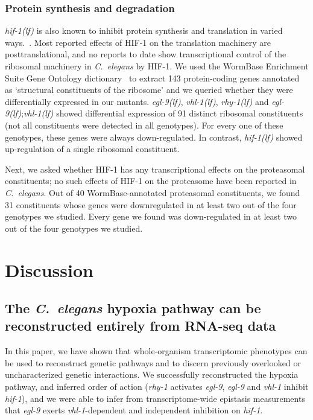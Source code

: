\documentclass[10pt, onecolumn]{article}
\newcommand{\cel}{\emph{C.~elegans}}
\newcommand{\gene}[1]{\emph{#1}}
\newcommand{\egl}{\emph{\mbox{egl-9}(lf)}}
\newcommand{\rhy}{\emph{\mbox{rhy-1}(lf)}}
\newcommand{\vhl}{\emph{\mbox{vhl-1}(lf)}}
\newcommand{\hif}{\emph{\mbox{hif-1(lf)}}}
\newcommand{\hifp}{HIF-1}
\begin{document}
\subsubsection*{Protein synthesis and degradation}
\hif{} is also known to inhibit protein synthesis and translation in varied
ways.~\cite{Brugarolas2004}. Most reported effects of
\hifp{} on the translation machinery are posttranslational, and no reports to date
show transcriptional control of the ribosomal machinery in \cel{} by \hifp{}. We
used the WormBase Enrichment Suite Gene Ontology
dictionary~\cite{Angeles-Albores2016b} to extract 143 protein-coding genes
annotated as `structural constituents of the ribosome' and we queried whether
they were differentially expressed in our mutants. \egl{}, \vhl{}, \rhy{} and
\egl{};\vhl{} showed differential expression of 91 distinct ribosomal constituents
(not all constituents were detected in all genotypes). For every one of these
genotypes, these genes were always down-regulated. In contrast, \hif{} showed
up-regulation of a single ribosomal constituent.

Next, we asked whether \hifp{} has any transcriptional effects on the
proteasomal constituents; no such effects of \hifp{} on the proteasome
have been reported in \cel{}. Out of 40 WormBase-annotated proteasomal constituents,
we found 31 constituents whose genes were downregulated in at least two out of
the four genotypes we studied. Every gene we found was down-regulated
in at least two out of the four genotypes we studied.

\section*{Discussion}
\subsection*{The \cel{} hypoxia pathway can be reconstructed entirely from
             RNA-seq data}
In this paper, we have shown that whole-organism transcriptomic phenotypes
can be used to reconstruct genetic pathways and to discern previously overlooked
or uncharacterized genetic interactions. We successfully reconstructed the hypoxia
pathway, and inferred order of action (\gene{rhy-1} activates \gene{egl-9},
\gene{egl-9} and \gene{vhl-1} inhibit \gene{hif-1}), and we were able to infer
from transcriptome-wide epistasis measurements that \gene{egl-9} exerts
\gene{vhl-1}-dependent and independent inhibition on \gene{hif-1}.
\end{document}
